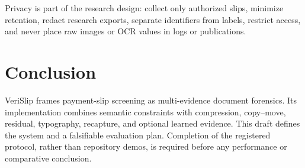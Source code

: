 \documentclass[conference]{IEEEtran}
\begin{document}
Privacy is part of the research design: collect only authorized slips, minimize
retention, redact research exports, separate identifiers from labels, restrict
access, and never place raw images or OCR values in logs or publications.

\section{Conclusion}
VeriSlip frames payment-slip screening as multi-evidence document forensics. Its
implementation combines semantic constraints with compression, copy--move,
residual, typography, recapture, and optional learned evidence. This draft
defines the system and a falsifiable evaluation plan. Completion of the
registered protocol, rather than repository demos, is required before any
performance or comparative conclusion.



\end{document}
